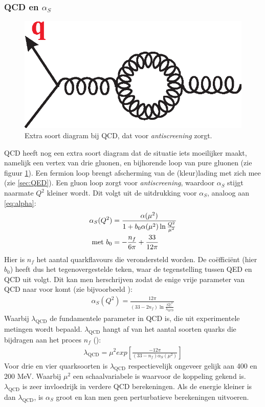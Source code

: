 \documentclass[a4paper,11pt]{article}
\numberwithin{equation}{section} %
\begin{document}
    \subsubsection{QCD en $\alpha_S$}
\begin{figure} [H]
  \begin{center}
    \includegraphics[scale=.33]{Afbeeldingen/GluonLoop.eps}
    \caption{Extra soort diagram bij QCD, dat voor \textit{antiscreening} zorgt. \cite{Martin}}
   \label{fig:GluonLoop}
  \end{center}
\end{figure}
QCD heeft nog een extra soort diagram dat de situatie iets moeilijker maakt, namelijk een vertex van drie gluonen, en bijhorende loop van pure gluonen (zie figuur \ref{fig:GluonLoop}).
Een fermion loop brengt afscherming van de (kleur)lading met zich mee (zie \ref{sec:QED}).
Een gluon loop zorgt voor \textit{antiscreening}, waardoor  $\alpha_S$ stijgt naarmate $Q^2$ kleiner wordt.
Dit volgt uit de uitdrukking voor $\alpha_S$, analoog aan \eqref{eq:alpha}:
\begin{align}
\alpha_S( Q^2 ) &=\frac{\alpha(\mu^2)}{1+b_0 \alpha(\mu^2) \ln{\frac{Q^2}{\mu^2}}} \\
\text{met } b_0 &= -\frac{n_f}{6\pi} + \frac{33}{12\pi} \notag
\end{align}
Hier is $n_f$ het aantal quarkflavours die verondersteld worden.
De coëfficiënt (hier $b_0$) heeft dus het tegenovergestelde teken, waar de tegenstelling tussen QED en QCD uit volgt.
Dit kan men herschrijven zodat de enige vrije parameter van QCD naar voor komt (zie bijvoorbeeld \cite[sectie 6.6]{Bettini}):
\begin{align} \label{eq:runningAlphaS}
\alpha_S(Q^2) = \frac{12\pi}{(33-2n_f) \ln{\frac{|Q|^2}{\lambda_\text{QCD}}}}
\end{align}
Waarbij $\lambda_\text{QCD}$ de fundamentele parameter in QCD is, die uit experimentele metingen wordt bepaald.
$\lambda_\text{QCD}$ hangt af van het aantal soorten quarks die bijdragen aan het proces $n_f$ (\cite[sectie 6.6]{Bettini}):
\begin{align}
\lambda_\text{QCD} = \mu^2 exp \left[ \frac{-12\pi}{(33-n_f) \alpha_S(\mu^2)} \right]
\end{align}
Voor drie en vier quarksoorten is $\lambda_\text{QCD}$ respectievelijk ongeveer gelijk aan 400 en 200 MeV.
Waarbij $\mu^2$ een schaalvariabele is waarvoor de koppeling gekend is.
$\lambda_\text{QCD}$ is zeer invloedrijk in verdere QCD berekeningen.
Als de energie kleiner is dan $\lambda_\text{QCD}$, is $\alpha_S$ groot en kan men geen perturbatieve berekeningen uitvoeren.
\end{document}
